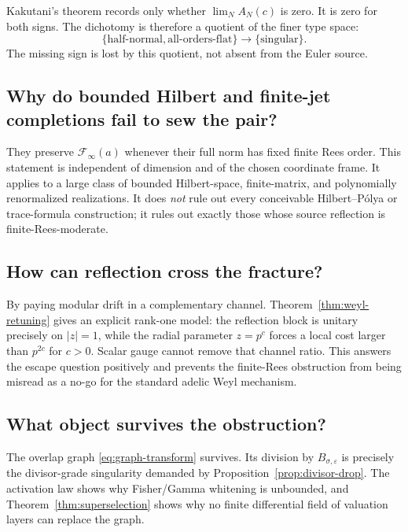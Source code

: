 \documentclass[11pt]{article}
\theoremstyle{definition}
\theoremstyle{remark}
\newcommand{\cF}{\mathcal F}
\begin{document}
Kakutani's theorem records only whether \(\lim_NA_N(c)\) is zero.  It is zero for both
signs.  The dichotomy is therefore a quotient of the finer type space:
\[
 \{\text{half-normal},\text{all-orders-flat}\}
 \longrightarrow
 \{\text{singular}\}.
\tag{11.3}\label{eq:kakutani-quotient}
\]
The missing sign is lost by this quotient, not absent from the Euler source.

\subsection{Why do bounded Hilbert and finite-jet completions fail to sew the pair?}

They preserve \(\cF_\infty(a)\) whenever their full norm has fixed finite Rees order.
This statement is independent of dimension and of the chosen coordinate frame.  It applies to a
large class of bounded Hilbert-space, finite-matrix, and polynomially renormalized realizations.
It does \emph{not} rule out every conceivable Hilbert--P\'olya or trace-formula construction; it
rules out exactly those whose source reflection is finite-Rees-moderate.

\subsection{How can reflection cross the fracture?}

By paying modular drift in a complementary channel.  Theorem~\ref{thm:weyl-retuning} gives an
explicit rank-one model: the reflection block is unitary precisely on \(|z|=1\), while the radial
parameter \(z=p^c\) forces a local cost larger than \(p^{2c}\) for \(c>0\).  Scalar gauge cannot
remove that channel ratio.  This answers the escape question positively and prevents the
finite-Rees obstruction from being misread as a no-go for the standard adelic Weyl mechanism.

\subsection{What object survives the obstruction?}

The overlap graph \eqref{eq:graph-transform} survives.  Its division by
\(B_{\sigma,\varepsilon}\) is precisely the divisor-grade singularity demanded by
Proposition~\ref{prop:divisor-drop}.  The activation law shows why Fisher/Gamma whitening is
unbounded, and Theorem~\ref{thm:superselection} shows why no finite differential field of
valuation layers can replace the graph.
\end{document}
